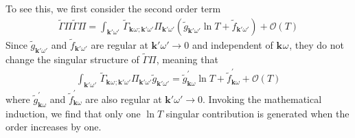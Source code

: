 \documentclass[%
 reprint,
superscriptaddress,
 amsmath,amssymb,
 aps,
prx,
]{revtex4-2}
\newcommand{\bk}{\mathbf{k}}
\newcommand{\Gammapp}{\tilde{\Gamma}}
\begin{document}
\begin{appendices}
To see this, we first consider the second order term 
\begin{gather}
\Gammapp \Pi\Gammapp \Pi = \int_{\bk'\omega'} \, \Gammapp_{\bk^{}\omega^{};\bk'\omega'} \Pi_{\bk'\omega'}(\tilde{g}_{\bk'\omega'} \ln T + \tilde{f}_{\bk'\omega'})+\mathcal{O}(T)
\end{gather}
 Since $\tilde{g}_{\bk'\omega'}$ and $\tilde{f}_{\bk'\omega'}$ are regular at $\bk'\omega'\rightarrow 0$ and independent of $\bk^{}\omega^{}$, they do not change the singular structure of $\Gammapp \Pi$, meaning that 
\begin{gather}
\int_{\bk'\omega'} \, \Gammapp_{\bk^{}\omega^{};\bk'\omega'} \Pi_{\bk'\omega'} \tilde{g}_{\bk'\omega'}=\tilde{g}^{\prime}_{\bk\omega} \ln T + \tilde{f}^{\prime}_{\bk\omega} + \mathcal O(T)
\end{gather}
where $\tilde{g}^{\prime}_{\bk\omega}$ and $\tilde{f}^{\prime}_{\bk\omega}$ are also regular at
$\bk'\omega'\rightarrow0$. Invoking the mathematical induction, we find that only one $\ln T$
singular contribution is generated when the order increases by one. 


\end{appendices}
\end{document}
